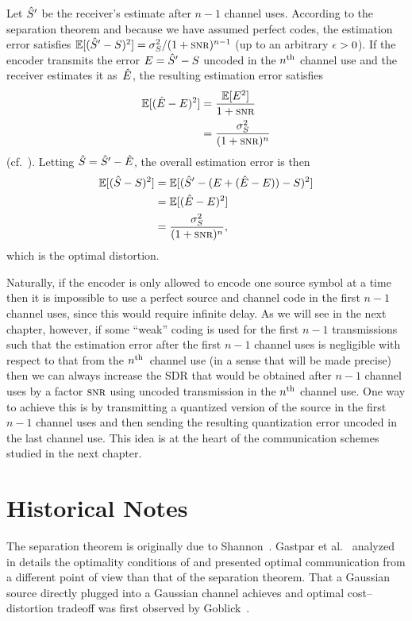 Let ${\hat{S}}'$ be the receiver's estimate after $n-1$ channel uses. According to the
separation theorem and because we have assumed perfect codes,
the estimation error satisfies $\E[(\Sh' - S)^2] = \ssq / (1 + \snr)^{n-1}$ (up
to an arbitrary $\epsilon > 0$). If the encoder transmits the error $E = {\hat{S}}' - S$
uncoded in the $n{^{\text{th}}}$ channel use and the receiver estimates it as~$\hat{E}$, the
resulting estimation error satisfies
\begin{align*}
  \E[(\Eh - E)^2] &= \frac{\E[E^2]}{ 1 + \snr } \\
  &= \frac{\ssq}{(1 + \snr)^n}
\end{align*}
(cf.~).
Letting ${\hat{S}} = {\hat{S}}' - \hat{E}$, the overall estimation error is then 
\begin{align*}
  \E[(\Sh - S)^2] &= \E[(\Sh' - (E + (\Eh - E)) - S)^2] \\
  &= \E[(\Eh - E)^2] \\
  &= \frac{\ssq}{(1 + \snr)^n},
\end{align*}
which is the optimal distortion. 

Naturally, if the encoder is only allowed to encode one source symbol at a time
then it is impossible to use a perfect source and channel code in the first
$n-1$ channel uses, since this would require infinite delay. As we will see in
the next chapter, however, if some ``weak'' coding is used for the first $n-1$
transmissions such that the estimation error after the first $n-1$ channel uses
is negligible with respect to that from the $n{^{\text{th}}}$~channel use (in a sense that
will be made precise) then we can always increase the SDR that
would be obtained after $n-1$ channel uses by a factor $\snr$ using uncoded
transmission in the $n{^{\text{th}}}$ channel use. One way to achieve this is by
transmitting a quantized version of the source in the first $n-1$ channel uses
and then sending the resulting quantization error uncoded in the last channel
use. This idea is at the heart of the communication schemes studied in the next
chapter.


\section{Historical Notes}

The separation theorem is originally due to Shannon~\cite{Shannon1948}. Gastpar
et al.~\cite{GastparRV2003} analyzed in details the optimality conditions of
 and presented optimal communication from a
different point of view than that of the separation theorem. That a Gaussian
source directly plugged into a Gaussian channel achieves and optimal
cost--distortion tradeoff was first observed by Goblick~\cite{Goblick1965}.

